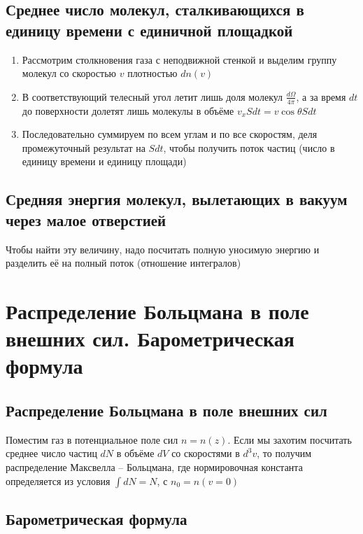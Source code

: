 \documentclass[a4paper, 14pt]{article}
\begin{document}
    \subsection{Среднее число молекул, сталкивающихся в единицу времени с единичной площадкой}
    
    \begin{enumerate}
        \item Рассмотрим столкновения газа с неподвижной стенкой и выделим группу молекул со скоростью $v$ плотностью
        $dn(v)$
        \item В соответствующий телесный угол летит лишь доля молекул $\frac{d\Omega}{4\pi}$, а за время $dt$ до
        поверхности долетят лишь молекулы в объёме $v_x Sdt = v \cos \theta Sdt$
        \item Последовательно суммируем по всем углам и по все скоростям, деля промежуточный результат на $Sdt$,
        чтобы получить поток частиц (число в единицу времени и единицу площади)
    \end{enumerate}
    
    \subsection{Средняя энергия молекул, вылетающих в вакуум через малое отверстией}
    
    Чтобы найти эту величину, надо посчитать полную уносимую энергию и разделить её на полный поток (отношение
    интегралов)
    
    \section{Распределение Больцмана в поле внешних сил.
    Барометрическая формула}
    
    \subsection{Распределение Больцмана в поле внешних сил}
    
    Поместим газ в потенциальное поле сил $n = n(z)$.
    Если мы захотим посчитать среднее число частиц $dN$ в объёме $dV$ со скоростями в $d^3 v$, то получим
    распределение Максвелла -- Больцмана, где нормировочная константа определяется из условия $\int dN = N$, с $n_0
    = n(v = 0)$
    
    \subsection{Барометрическая формула}
    
\end{document}
